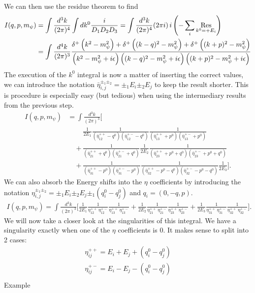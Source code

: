 We can then use the residue theorem to find
\begin{align*}
   I(q,p,m_\psi) &= \int\frac{d^3k}{(2\pi)^4} \int dk^0 \frac{i}{D_1D_2D_3} = \int\frac{d^3k}{(2\pi)^4} (2\pi i) \, i \left( - \sum_i \Op{Res}_{k^0 = +E_i} \right)\\
    &= \int\frac{d^4k}{(2\pi)^3}
\frac{\delta^{+}\left( k^2 - m_\psi^2 \right)+\delta^{+}\left( (k-q)^2 - m_\psi^2 \right)+\delta^{+}\left( (k+p)^2 - m_\psi^2 \right)}{\left(k^2-m_\psi^2+i\epsilon\right)\left((k-q)^2-m_\psi^2+i\epsilon\right)\left((k+p)^2-m_\psi^2+i\epsilon\right)}
\end{align*}
The execution of the $k^0$ integral is now a matter of inserting the correct values, we can introduce the notation $\bar{\eta}^{\pm_1\pm_2}_{i,j} =\pm_1E_i \pm_2E_j$ to keep the result shorter. This is procedure is especially easy (but tedious) when using the intermediary results from the previous step.
\begin{align*}
    I(q,p,m_\psi)
    &= \int\frac{d^3k}{(2\pi)^3}
    \Bigg[\\
    &\quad \phantom{+} \frac{1}{2E_1}
    \frac{1}{(\bar{\eta}^{++}_{12} - q^0)(\bar{\eta}^{+-}_{12} - q^0)}
    \frac{1}{(\bar{\eta}^{++}_{13} + p^0)(\bar{\eta}^{+-}_{13} + p^0)} \\
    &\quad +
    \frac{1}{(\bar{\eta}^{++}_{21} + q^0)(\bar{\eta}^{+-}_{21} + q^0)}
    \frac{1}{2E_2}
    \frac{1}{(\bar{\eta}^{++}_{23} + p^0 + q^0)(\bar{\eta}^{+-}_{23} + p^0 + q^0)} \\
    &\quad +
    \frac{1}{(\bar{\eta}^{++}_{31} - p^0)(\bar{\eta}^{+-}_{31} - p^0)}
    \frac{1}{(\bar{\eta}^{++}_{32} - p^0 - q^0)(\bar{\eta}^{+-}_{32} - p^0 - q^0)}
    \frac{1}{2E_3}
    \Bigg].
\end{align*}
We can also absorb the Energy shifts into the $\eta$ coefficients by introducing the notation $\eta^{\pm_1\pm_2}_{i,j} =\pm_1E_i \pm_2E_j \pm_1 (q^0_i-q^0_j)$ and $q_i = (0,-q, p)$.
\begin{align*}
    I(q,p,m_\psi)
    = \int\frac{d^3k}{(2\pi)^3}
    \Bigg[
    \frac{1}{2E_1}
    \frac{1}{\eta^{++}_{12}\,\eta^{+-}_{12}}
    \frac{1}{\eta^{++}_{13}\,\eta^{+-}_{13}}
     +
    \frac{1}{2E_2}
    \frac{1}{\eta^{++}_{21}\,\eta^{+-}_{21}}
    \frac{1}{\eta^{++}_{23}\,\eta^{+-}_{23}}
     +
    \frac{1}{2E_3}
    \frac{1}{\eta^{++}_{31}\,\eta^{+-}_{31}}
    \frac{1}{\eta^{++}_{32}\,\eta^{+-}_{32}}
    \Bigg].
\end{align*}
We will now take a closer look at the singularities of this integral. We have a singularity exactly when one of the $\eta$ coefficients is $0$. It makes sense to split into 2 cases:
\begin{align}
    \eta^{++}_{ij} = E_i + E_j + (q^0_i - q^0_j)\\
    \eta^{+-}_{ij} = E_i - E_j - (q^0_i - q^0_j)\\
\end{align}
Example